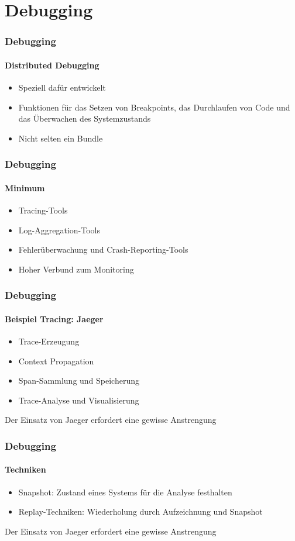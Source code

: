 \section{Debugging}
\begin{frame}
  \frametitle{Debugging}
  \framesubtitle{Distributed Debugging}
  \begin{itemize}
    \item Speziell dafür entwickelt
    \item Funktionen für das Setzen von Breakpoints, das Durchlaufen von Code und das Überwachen des Systemzustands
    \item Nicht selten ein Bundle 
  \end{itemize}
\end{frame}

\begin{frame}
  \frametitle{Debugging}
  \framesubtitle{Minimum}
  \begin{itemize}
    \item Tracing-Tools
    \item Log-Aggregation-Tools
    \item Fehlerüberwachung und Crash-Reporting-Tools
    \item Hoher Verbund zum Monitoring
  \end{itemize}
\end{frame}

\begin{frame}
  \frametitle{Debugging}
  \framesubtitle{Beispiel Tracing: Jaeger}
  \begin{itemize}
    \item Trace-Erzeugung
    \item Context Propagation
    \item Span-Sammlung und Speicherung 
    \item Trace-Analyse und Visualisierung
  \end{itemize}
  Der Einsatz von Jaeger erfordert eine gewisse Anstrengung
\end{frame}

\begin{frame}
  \frametitle{Debugging}
  \framesubtitle{Techniken}
  \begin{itemize}
    \item Snapshot: Zustand eines Systems für die Analyse festhalten
    \item Replay-Techniken: Wiederholung durch Aufzeichnung und Snapshot
  \end{itemize}
  Der Einsatz von Jaeger erfordert eine gewisse Anstrengung
\end{frame}

